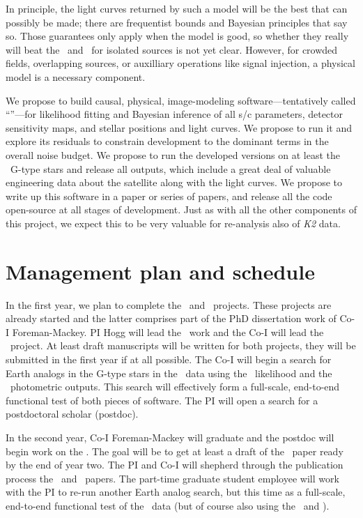 \documentclass[letterpaper,12pt,preprint]{hack_aastex}
\begin{document}
In principle, the light curves returned by such a model will be the best that
can possibly be made; there are frequentist bounds and Bayesian principles
that say so.
Those guarantees only apply when the model is good, so whether they really
will beat the \PLM\ and \OWL\ for isolated sources is not yet clear.
However, for crowded fields, overlapping sources, or auxilliary operations
like signal injection, a physical model is a necessary component.

We propose to build causal, physical, image-modeling
software---tentatively called ``\kpsf''---for likelihood fitting and Bayesian
inference of all s/c parameters, detector sensitivity maps, and stellar
positions and light curves.
We propose to run it and explore its residuals to constrain development to
the dominant terms in the overall noise budget.
We propose to run the developed versions on at least the \Kepler\ G-type
stars and release all outputs, which include a great deal of valuable
engineering data about the satellite along with the light curves.
We propose to write up this software in a paper or series of papers,
and release all the code open-source at all stages of development.
Just as with all the other components of this project, we expect this to be
very valuable for re-analysis also of \textsl{K2} data.

\section{Management plan and schedule}

In the first year, we plan to complete the \OWL\ and \George\ projects.
These projects are already started and the latter comprises part of the PhD
dissertation work of Co-I Foreman-Mackey.
PI Hogg will lead the \OWL\ work and the Co-I will lead the \George\ project.
At least draft manuscripts will be written for both projects, they will
be submitted in the first year if at all possible.
The Co-I will begin a search for Earth analogs in the G-type stars in the
\Kepler\ data using the \George\ likelihood and the \OWL\ photometric outputs.
This search will effectively form a full-scale, end-to-end functional test of
both pieces of software.
The PI will open a search for a postdoctoral scholar (postdoc).

In the second year, Co-I Foreman-Mackey will graduate and the postdoc will
begin work on the \PLM.
The goal will be to get at least a draft of the \PLM\ paper ready by the end
of year two.
The PI and Co-I will shepherd through the publication process the \OWL\ and
\George\ papers.
The part-time graduate student employee will work with the PI to
re-run another Earth analog search, but this time
as a full-scale, end-to-end functional test of the \PLM\ data (but of course
also using the \OWL\ and \George).
\end{document}
